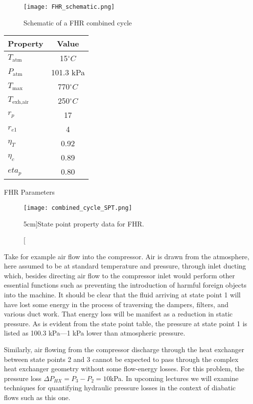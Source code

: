 \begin{figure}
\texttt{[image: FHR\_schematic.png]}
\caption{Schematic of a FHR combined cycle}
\label{fig:FHR_schematic}
\end{figure}

\begin{margintable}
\begin{tabular}{lc}
\toprule
Property & Value \\
\midrule
$T_{\text{atm}}$ & 15$^{\circ}C$ \\
$P_{\text{atm}}$ & 101.3 kPa \\
$T_{\text{max}}$ & 770$^{\circ}C$ \\
$T_{\text{exh,air}}$ & 250$^{\circ}C$ \\
$r_{p}$ & 17 \\
$r_{e1}$ & 4 \\
$\eta_T$ & 0.92 \\
$\eta_c$ & 0.89 \\
$eta_p$ & 0.80 \\
\bottomrule
\end{tabular}
\caption{FHR Parameters}
\label{tab:FHR_params}
\end{margintable}

\begin{figure}
\texttt{[image: combined\_cycle\_SPT.png]}
\caption[][5cm]{State point property data for FHR.}
\label{fig:combined_cycle_SPT}
\end{figure}

Take for example air flow into the compressor.  Air is drawn from the atmosphere, here assumed to be at standard temperature and pressure, through inlet ducting which, besides directing air flow to the compressor inlet would perform other essential functions such as preventing the introduction of harmful foreign objects into the machine. It should be clear that the fluid arriving at state point 1 will have lost some energy in the process of traversing the dampers, filters, and various duct work. That energy loss will be manifest as a reduction in static pressure.  As is evident from the state point table, the pressure at state point 1 is listed as 100.3 kPa---1 kPa lower than atmospheric pressure.  

Similarly, air flowing from the compressor discharge through the heat exchanger between state points 2 and 3 cannot be expected to pass through the complex heat exchanger geometry without some flow-energy losses.  For this problem, the pressure loss $\Delta P_{HX} = P_3 - P_2 = 10$kPa.  In upcoming lectures we will examine techniques for quantifying hydraulic pressure losses in the context of diabatic flows such as this one.


